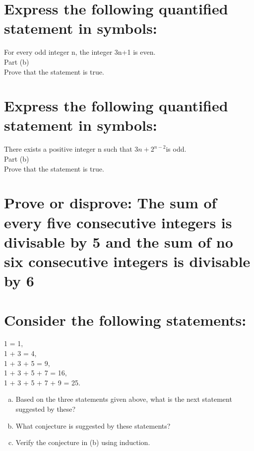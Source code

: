 \section{Express the following quantified statement in symbols:}
For every odd integer n, the integer 3n+1 is even.\\

Part (b) \\
Prove that the statement is true.

\section{Express the following quantified statement in symbols:}
There exists a positive integer n such that $3n+2^{n-2}$is odd.\\

Part (b) \\
Prove that the statement is true.

\section{Prove or disprove: The sum of every five consecutive integers is divisable by 5 and the sum of no six consecutive integers is divisable by 6}

\section{Consider the following statements:}
1 = 1,\\
1 + 3 = 4,\\
1 + 3 + 5 = 9,\\
1 + 3 + 5 + 7 = 16,\\
1 + 3 + 5 + 7 + 9 = 25.\\
\begin{enumerate}[(a)]
\item Based on the three statements given above, what is the next statement suggested by these?
\item What conjecture is suggested by these statements?
\item Verify the conjecture in (b) using induction.
\end{enumerate}

